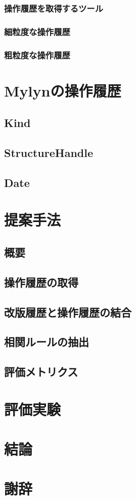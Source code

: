 \documentclass[a4paper]{jsbook}
\begin{document}
\subsection{操作履歴を取得するツール}
\subsection{細粒度な操作履歴}
\subsection{粗粒度な操作履歴}
\chapter{Mylynの操作履歴}
\section{Kind}
\section{StructureHandle}
\section{Date}
\chapter{提案手法}
\section{概要}
\section{操作履歴の取得}
\section{改版履歴と操作履歴の結合}
\section{相関ルールの抽出}
\section{評価メトリクス}
\chapter{評価実験}
\chapter{結論}
\chapter{謝辞}
\appendix

\backmatter


\end{document}
